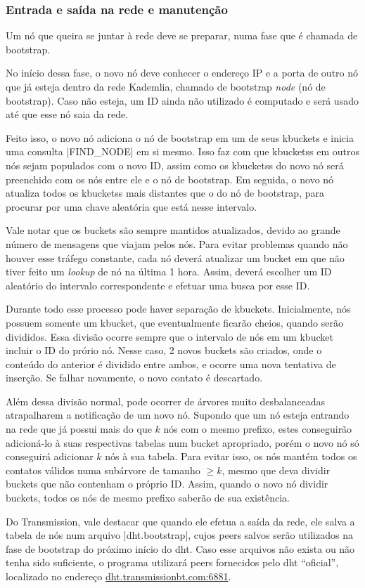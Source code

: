 
\subsubsection*{Entrada e saída na rede e manutenção}

Um nó que queira se juntar à rede deve se preparar, numa fase que é chamada de
\gls{bootstrap}.

No início dessa fase, o novo nó deve conhecer o endereço IP e a porta de outro nó que
já esteja dentro da rede Kademlia, chamado de \gls*{bootstrap} \emph{node} (nó de
\gls*{bootstrap}). Caso não esteja, um ID ainda não utilizado é computado e será usado
até que esse nó saia da rede.

Feito isso, o novo nó adiciona o nó de \gls*{bootstrap} em um de seus \glspl*{kbucket}
e inicia uma consulta \bverb|FIND_NODE| em si mesmo. Isso faz com que \glspl*{kbuckets}
em outros nós sejam populados com o novo ID, assim como os \glspl*{kbuckets} do novo nó
será preenchido com os nós entre ele e o nó de \gls*{bootstrap}. Em seguida, o novo
nó atualiza todos os \glspl*{kbuckets} mais distantes que o do nó de \gls*{bootstrap},
para procurar por uma chave aleatória que está nesse intervalo.

Vale notar que os \glspl*{bucket} são sempre mantidos atualizados, devido ao grande
número de mensagens que viajam pelos nós. Para evitar problemas quando não houver esse
tráfego constante, cada nó deverá atualizar um \gls*{bucket} em que não tiver feito um
\emph{lookup} de nó na última 1 hora. Assim, deverá escolher um ID aleatório do
intervalo correspondente e efetuar uma busca por esse ID.

Durante todo esse processo pode haver separação de \glspl*{kbucket}. Inicialmente, nós
possuem somente um \gls*{kbucket}, que eventualmente ficarão cheios, quando serão
divididos. Essa divisão ocorre sempre que o intervalo de nós em um \gls*{kbucket}
incluir o ID do prório nó. Nesse caso, 2 novos \glspl*{bucket} são criados, onde o
conteúdo do anterior é dividido entre ambos, e ocorre uma nova tentativa de inserção. Se
falhar novamente, o novo contato é descartado.

Além dessa divisão normal, pode ocorrer de árvores muito desbalanceadas atrapalharem a
notificação de um novo nó. Supondo que um nó esteja entrando na rede que já possui mais
do que $k$ nós com o mesmo prefixo, estes conseguirão adicioná-lo à suas respectivas
tabelas num \gls*{bucket} apropriado, porém o novo nó só conseguirá adicionar $k$ nós à
sua tabela. Para evitar isso, os nós mantém todos os contatos válidos numa subárvore de
tamanho $\geq k$, mesmo que deva dividir \glspl*{bucket} que não contenham o próprio
ID. Assim, quando o novo nó dividir \glspl*{bucket}, todos os nós de mesmo prefixo
saberão de sua existência.

Do Transmission, vale destacar que quando ele efetua a saída da rede, ele salva a tabela
de nós num arquivo \sverb|dht.bootstrap|, cujos \glspl*{peer} salvos serão utilizados na
fase de \gls*{bootstrap} do próximo início do \gls*{dht}. Caso esse arquivos não exista
ou não tenha sido suficiente, o programa utilizará \glspl*{peer} fornecidos pelo
\gls*{dht} ``oficial'', localizado no endereço \url{dht.transmissionbt.com:6881}.